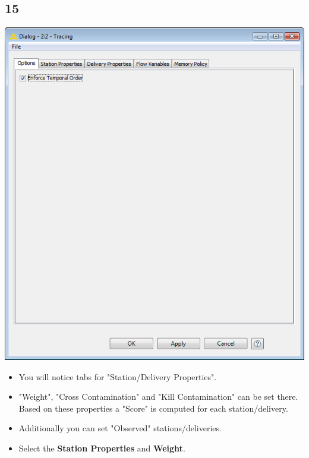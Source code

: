 \documentclass{beamer}
\begin{document}
\subsection{15}
\begin{frame}
	\begin{center}
  		\includegraphics[height=0.5\textheight]{15.png}
	\end{center}
	\begin{itemize}
		\item You will notice tabs for "Station/Delivery Properties".
		\item "Weight", "Cross Contamination" and "Kill Contamination" can be set there. Based on these properties a "Score" is computed for each station/delivery.
		\item Additionally you can set "Observed" stations/deliveries.
		\item Select the \textbf{Station Properties} and \textbf{Weight}.
	\end{itemize}
\end{frame}
\end{document}
